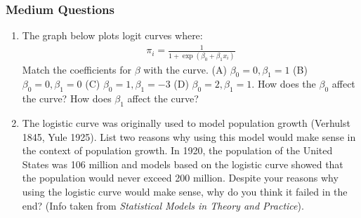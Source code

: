 \documentclass[11pt]{article}
\begin{document}
\subsubsection{Medium Questions}
\begin{enumerate}
\item The graph below plots logit curves where:
\begin{eqnarray*}
\pi_i = \frac{1}{1 + \exp{(\beta_0 + \beta_1x_i)}}
\end{eqnarray*}
Match the coefficients for $\beta$ with the curve. (A) $\beta_0=0, \beta_1=1$ (B) $\beta_0=0, \beta_1=0$ (C) $\beta_0= 1, \beta_1=-3$ (D) $\beta_0 = 2, \beta_1=1$.  How does the $\beta_0$ affect the curve?  How does $\beta_1$ affect the curve? 

\begin{center}
\label{fig:nonfloat}
\end{center}

\item The logistic curve was originally used to model population growth (Verhulst 1845, Yule 1925).  List two reasons why using this model would make sense in the context of population growth.  In 1920, the population of the United States was 106 million and models based on the logistic curve showed that the population would never exceed 200 million.  Despite your reasons why using the logistic curve would make sense, why do you think it failed in the end?  (Info taken from \emph{Statistical Models in Theory and Practice}). 


\end{enumerate}
\end{document}
